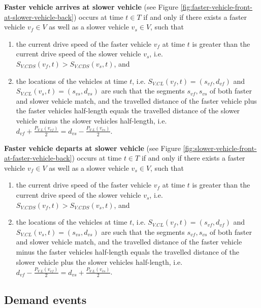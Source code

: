 \documentclass[graybox]{svmult}
\begin{document}
\noindent \textbf{Faster vehicle arrives at slower vehicle} (see Figure \ref{fig:faster-vehicle-front-at-slower-vehicle-back}) occurs at time $t \in T$ if and only if there exists a faster vehicle $v_{f} \in V$ as well as a slower vehicle $v_{s} \in V$, such that 
\begin{enumerate}
    \item the current drive speed of the faster vehicle $v_{f}$ at time $t$ is greater than the current drive speed of the slower vehicle $v_{s}$, i.e. $ S_{V.CDS}(v_{f},t) > S_{V.CDS}(v_{s},t)$, and
    \item the locations of the vehicles at time $t$, i.e. $S_{V.CL}(v_{f},t) = (s_{vf}, d_{vf})$ and  $S_{V.CL}(v_{s},t) = (s_{vs}, d_{vs})$ are such that the segments $s_{vf}, s_{vs}$ of both faster and slower vehicle match, and the travelled distance of the faster vehicle plus the faster vehicles half-length equals the travelled distance of the slower vehicle minus the slower vehicles half-length, i.e. $d_{vf} + \frac{P_{V.L}(v_{vf})}{2} = d_{vs} - \frac{P_{V.L}(v_{vs})}{2}$.
\end{enumerate}

\noindent \textbf{Faster vehicle departs at slower vehicle} (see Figure \ref{fig:slower-vehicle-front-at-faster-vehicle-back}) occurs at time $t \in T$ if and only if there exists a faster vehicle $v_{f} \in V$ as well as a slower vehicle $v_{s} \in V$, such that 
\begin{enumerate}
	\item the current drive speed of the faster vehicle $v_{f}$ at time $t$ is greater than the current drive speed of the slower vehicle $v_{s}$, i.e. $ S_{V.CDS}(v_{f},t) > S_{V.CDS}(v_{s},t)$, and
	\item the locations of the vehicles at time $t$, i.e. $S_{V.CL}(v_{f},t) = (s_{vf}, d_{vf})$ and  $S_{V.CL}(v_{s},t) = (s_{vs}, d_{vs})$ are such that the segments $s_{vf}, s_{vs}$ of both faster and slower vehicle match, and the travelled distance of the faster vehicle minus the faster vehicles half-length equals the travelled distance of the slower vehicle plus the slower vehicles half-length, i.e. $d_{vf} - \frac{P_{V.L}(v_{vf})}{2} = d_{vs} + \frac{P_{V.L}(v_{vs})}{2}$.
\end{enumerate}

\subsection{Demand events}
\label{sec:demand-events}
\end{document}
